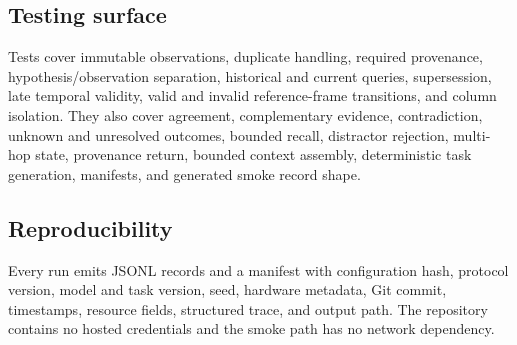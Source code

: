\subsection{Testing surface}

Tests cover immutable observations, duplicate handling, required provenance, hypothesis/observation separation, historical and current queries, supersession, late temporal validity, valid and invalid reference-frame transitions, and column isolation. They also cover agreement, complementary evidence, contradiction, unknown and unresolved outcomes, bounded recall, distractor rejection, multi-hop state, provenance return, bounded context assembly, deterministic task generation, manifests, and generated smoke record shape.

\subsection{Reproducibility}

Every run emits JSONL records and a manifest with configuration hash, protocol version, model and task version, seed, hardware metadata, Git commit, timestamps, resource fields, structured trace, and output path. The repository contains no hosted credentials and the smoke path has no network dependency.

